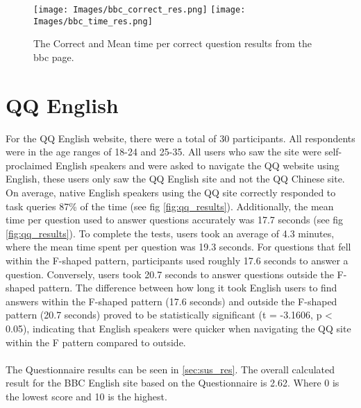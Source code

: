 \begin{figure}[h]
	\centering
	\texttt{[image: Images/bbc\_correct\_res.png]}
	\texttt{[image: Images/bbc\_time\_res.png]}
	\decoRule
	\caption[BBC Results]{The Correct and Mean time per correct question results from the bbc page.}
	\label{fig:bbc_results}
\end{figure}
\newpage

\section{QQ English }
For the QQ English website, there were a total of 30 participants. All respondents were in the age ranges of 18-24 and 25-35. All users who saw the site were self-proclaimed English speakers and were asked to navigate the QQ website using English, these users only saw the QQ English site and not the QQ Chinese site. On average, native English speakers using the QQ site correctly responded to task queries 87\% of the time (see fig \ref{fig:qq_results}). Additionally, the mean time per question used to answer questions accurately was 17.7 seconds (see fig \ref{fig:qq_results}). To complete the tests, users took an average of 4.3 minutes, where the mean time spent per question was 19.3 seconds. For questions that fell within the F-shaped pattern, participants used roughly 17.6 seconds to answer a question. Conversely, users took 20.7 seconds to answer questions outside the F-shaped pattern. The difference between how long it took English users to find answers within the F-shaped pattern (17.6 seconds) and outside the F-shaped pattern (20.7 seconds) proved to be statistically significant (t = -3.1606, p < 0.05), indicating that English speakers were quicker when navigating the QQ site within the F pattern compared to outside. 
\\\\
The Questionnaire results can be seen in \ref{sec:sus_res}. The overall calculated result for the BBC English site based on the Questionnaire is 2.62. Where 0 is the lowest score and 10 is the highest.

